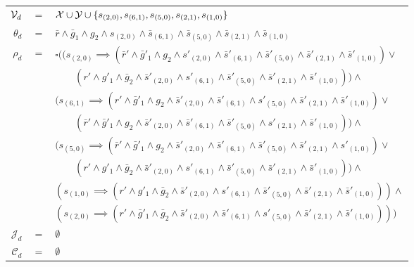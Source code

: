 \footnotesize
\vspace{1em}
\begin{tabular}{ r c l }
	${\mathcal{V}}_{d}$ &$=$& ${\mathcal{X}} \cup {\ensuremath{\mathcal{Y}}} \cup \{s_{(2,0)},s_{(6,1)},s_{(5,0)},s_{(2,1)},s_{(1,0)}\}$\\	
	$\theta_{d}$ &$=$& $\bar{r} \wedge \bar{g}_1 \wedge g_2 \wedge s_{(2,0)}  \wedge \bar{s}_{(6,1)}  \wedge \bar{s}_{(5,0)}  \wedge \bar{s}_{(2,1)}  \wedge \bar{s}_{(1,0)}$\\						
	$\rho_{d}$ &$=$& $\square((s_{(2,0)}\implies (\bar{r}' \wedge \bar{g}'_1 \wedge g_2 \wedge s'_{(2,0)}  \wedge \bar{s}'_{(6,1)}  \wedge \bar{s}'_{(5,0)}  \wedge \bar{s}'_{(2,1)}  \wedge \bar{s}'_{(1,0)}) \vee$\\
	&&$\qquad(r' \wedge g'_1 \wedge \bar{g}_2 \wedge \bar{s}'_{(2,0)}  \wedge s'_{(6,1)}  \wedge \bar{s}'_{(5,0)}  \wedge \bar{s}'_{(2,1)}  \wedge \bar{s}'_{(1,0)})) \wedge$\\
	&& $(s_{(6,1)}\implies (r' \wedge \bar{g}'_1 \wedge g_2 \wedge \bar{s}'_{(2,0)}  \wedge \bar{s}'_{(6,1)}  \wedge s'_{(5,0)}  \wedge \bar{s}'_{(2,1)}  \wedge \bar{s}'_{(1,0)}) \vee$\\
	&&$\qquad(\bar{r}' \wedge \bar{g}'_1 \wedge g_2 \wedge \bar{s}'_{(2,0)}  \wedge \bar{s}'_{(6,1)}  \wedge \bar{s}'_{(5,0)}  \wedge s'_{(2,1)}  \wedge \bar{s}'_{(1,0)})) \wedge$\\		
	&& $(s_{(5,0)}\implies (\bar{r}' \wedge \bar{g}'_1 \wedge g_2 \wedge \bar{s}'_{(2,0)}  \wedge \bar{s}'_{(6,1)}  \wedge \bar{s}'_{(5,0)}  \wedge \bar{s}'_{(2,1)}  \wedge s'_{(1,0)}) \vee$\\
	&&$\qquad(r' \wedge g'_1 \wedge \bar{g}_2 \wedge \bar{s}'_{(2,0)}  \wedge s'_{(6,1)}  \wedge \bar{s}'_{(5,0)}  \wedge \bar{s}'_{(2,1)}  \wedge \bar{s}'_{(1,0)})) \wedge$\\			
	&& $(s_{(1,0)}\implies (r' \wedge g'_1 \wedge \bar{g}_2 \wedge \bar{s}'_{(2,0)}  \wedge s'_{(6,1)}  \wedge \bar{s}'_{(5,0)}  \wedge \bar{s}'_{(2,1)}  \wedge \bar{s}'_{(1,0)})) \wedge$\\				
	&& $(s_{(2,0)}\implies (r' \wedge \bar{g}'_1 \wedge \bar{g}_2 \wedge \bar{s}'_{(2,0)}  \wedge \bar{s}'_{(6,1)}  \wedge s'_{(5,0)}  \wedge \bar{s}'_{(2,1)}  \wedge \bar{s}'_{(1,0)})))$\\	
	$\mathcal{J}_d$ & $=$ & $\emptyset$\\
$\mathcal{C}_d$ & $=$ & $\emptyset$\\					
\end{tabular}
\vspace{1em}
\normalsize

